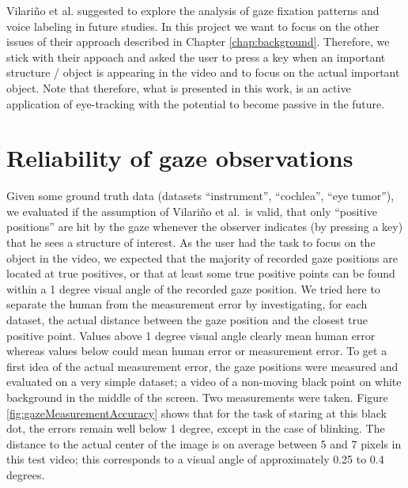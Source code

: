 Vilari\~no et al. suggested to explore the analysis of gaze fixation patterns and voice labeling in future studies. 
In this project we want to focus on the other issues of their approach described in Chapter \ref{chap:background}. 
Therefore, we stick with their appoach and asked the user to press a key when an important structure / object is appearing in the video and to focus on the actual important object. 
Note that therefore, what is presented in this work, is an active application of eye-tracking with the potential to become passive in the future.

\section{Reliability of gaze observations}
Given some ground truth data (datasets ``instrument'', ``cochlea'', ``eye tumor''), we evaluated if the assumption of Vilari\~no et al.\ is valid, that only ``positive positions'' are hit by the gaze whenever the observer indicates (by pressing a key) that he sees a structure of interest. 
As the user had the task to focus on the object in the video, we expected that the majority of recorded gaze positions are located at true positives, or that at least some true positive points can be found within a 1 degree visual angle of the recorded gaze position. 
We tried here to separate the human from the measurement error by investigating, for each dataset, the actual distance between the gaze position and the closest true positive point. 
Values above 1 degree visual angle clearly mean human error whereas values below could mean human error or measurement error. 
To get a first idea of the actual measurement error, the gaze positions were measured and evaluated on a very simple dataset; a video of a non-moving black point on white background in the middle of the screen. 
Two measurements were taken. Figure \ref{fig:gazeMeasurementAccuracy} shows that for the task of staring at this black dot, the errors remain well below 1 degree, except in the case of blinking. 
The distance to the actual center of the image is on average between 5 and 7 pixels in this test video; this corresponds to a visual angle of approximately 0.25 to 0.4 degrees.

